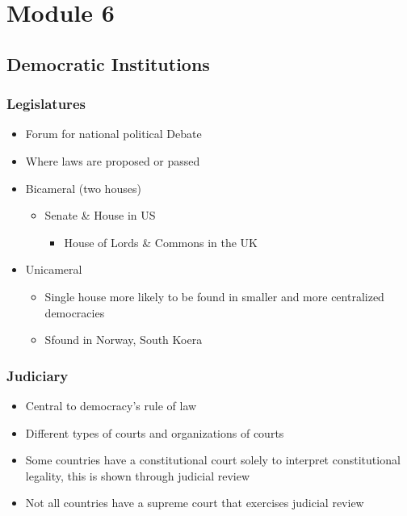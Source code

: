 \documentclass[11pt]{article}
\author{Sudhan Chitgopkar}
\date{\today}
\title{}
\begin{document}
\tableofcontents

\section{Module 6}
\label{sec:orgf9ab1d2}
\subsection{Democratic Institutions}
\label{sec:org70637b3}
\subsubsection{Legislatures}
\label{sec:org32b400d}
\begin{itemize}
\item Forum for national political Debate
\item Where laws are proposed or passed
\item Bicameral (two houses)
\begin{itemize}
\item Senate \& House in US
\begin{itemize}
\item House of Lords \& Commons in the UK
\end{itemize}
\end{itemize}
\item Unicameral
\begin{itemize}
\item Single house more likely to be found in smaller and more centralized democracies
\item Sfound in Norway, South Koera
\end{itemize}
\end{itemize}
\subsubsection{Judiciary}
\label{sec:org1c4b729}
\begin{itemize}
\item Central to democracy's rule of law
\item Different types of courts and organizations of courts
\item Some countries have a constitutional court solely to interpret constitutional legality,
this is shown through judicial review
\item Not all countries have a supreme court that exercises judicial review
\end{itemize}
\end{document}
